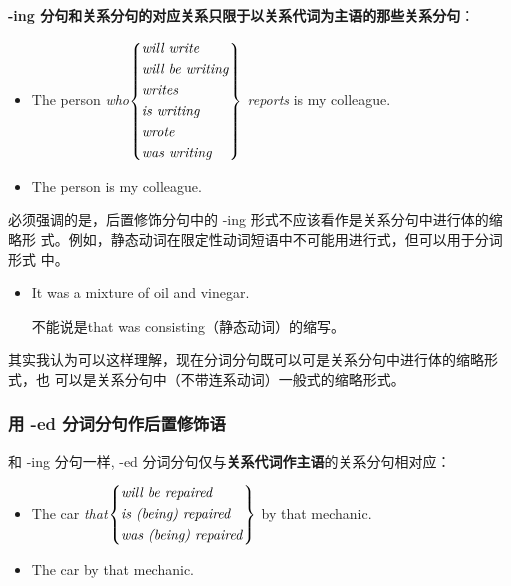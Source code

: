 \textbf{-ing 分句和关系分句的对应关系只限于以关系代词为主语的那些关系分句}：
\begin{itemize}
\item The person \emph{who}$\left\{
    \begin{aligned}
      &\text{\emph{will write}} \\
      &\text{\emph{will be writing}} \\
      &\text{\emph{writes}} \\
      &\text{\emph{is writing}} \\
      &\text{\emph{wrote}} \\
      &\text{\emph{was writing}} \\
    \end{aligned}
  \right\} $ \emph{reports} is my colleague.

\item The person  is my colleague.
\end{itemize}

必须强调的是，后置修饰分句中的 -ing 形式不应该看作是关系分句中进行体的缩略形
式。例如，静态动词在限定性动词短语中不可能用进行式，但可以用于分词形式
中。
\begin{itemize}
\item It was a mixture  of oil and vinegar.

  不能说是that was consisting（静态动词）的缩写。
\end{itemize}
其实我认为可以这样理解，现在分词分句既可以可是关系分句中进行体的缩略形式，也
可以是关系分句中（不带连系动词）一般式的缩略形式。


\subsubsection{用 -ed 分词分句作后置修饰语}

和 -ing 分句一样, -ed 分词分句仅与\textbf{关系代词作主语}的关系分句相对应：
\begin{itemize}
\item The car \emph{that}$\left\{
    \begin{aligned}
      &\text{\emph{will be repaired}} \\
      &\text{\emph{is (being) repaired}} \\
      &\text{\emph{was (being) repaired}} \\
    \end{aligned}
  \right\} $ by that mechanic.

\item The car   by that mechanic.
\end{itemize}

